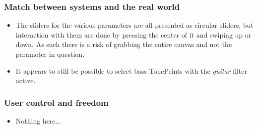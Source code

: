 \subsubsection{Match between systems and the real world}
\begin{itemize}
	\item The sliders for the various parameters are all presented as circular sliders, but interaction with them are done by pressing the center of it and swiping up or down. As such there is a risk of grabbing the entire canvas and not the parameter in question.\\
	\item It appears to still be possible to select bass TonePrints with the \textit{guitar} filter active.
\end{itemize}
%
\subsubsection{User control and freedom}
\begin{itemize}
	\item Nothing here...
\end{itemize}
%
